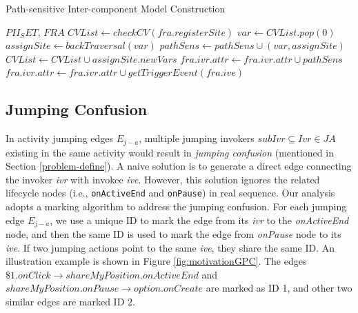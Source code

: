 
\begin{algorithm}
\caption{Path-sensitive Inter-component Model Construction}
\footnotesize
\begin{algorithmic}[1]
 {$PII_SET$, $FRA$}
\State $          CVList \leftarrow checkCV(fra.registerSite ) $
\State $                 var \leftarrow CVList.pop(0)$
\State $                 assignSite \leftarrow backTraversal(var)$
\State $                 pathSens \leftarrow pathSens \cup (var, assignSite )$
\State $                     CVList \leftarrow CVList \cup assignSite.newVars$
\EndIf
\EndWhile    
\State $           fra.ivr.attr \leftarrow fra.ivr.attr \cup pathSens $
\State $           fra.ivr.attr \leftarrow fra.ivr.attr \cup getTriggerEvent(fra.ive)$
\EndFor
\EndProcedure
\end{algorithmic}
\label{fig:alg3}
\end{algorithm}

\subsection{Jumping Confusion}\label{jumpConfusion}
In activity jumping edges $E_{j-a}$, multiple jumping invokers $subIvr\subseteq Ivr\in JA$  existing in the same activity would result in \textit{jumping confusion} (mentioned in Section \ref{problem-define}). A naive solution is to generate a direct edge connecting the invoker \textit{ivr} with invokee \textit{ive}. However, this solution ignores the related lifecycle nodes (i.e., \texttt{onActiveEnd} and \texttt{onPause}) in real sequence. Our analysis adopts a marking algorithm to address the jumping confusion. For each jumping edge $E_{j-a}$, we use a unique ID to mark the edge from its \textit{ivr} to the \textit{onActiveEnd} node, and then the same ID is used to mark the edge from \textit{onPause} node to its \textit{ive}. If two jumping actions point to the same \textit{ive}, they share the same ID. An illustration example is shown in Figure \ref{fig:motivationGPC}. The edges $\$1.onClick\rightarrow shareMyPosition.onActiveEnd$ and $shareMyPosition.onPause\rightarrow option.onCreate$ are marked as ID 1, and other two similar edges are marked ID 2.

